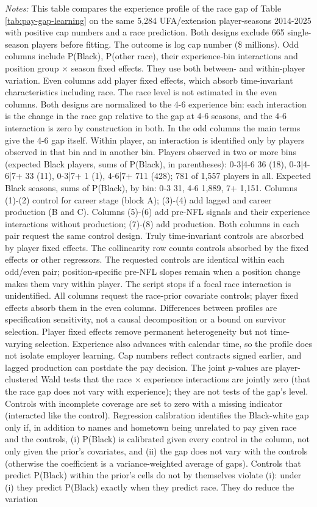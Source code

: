 {\footnotesize
\noindent\textit{Notes:} This table compares the experience profile of the race gap of Table \ref{tab:pay-gap-learning} on the same 5,284 UFA/extension player-seasons 2014-2025 with positive cap numbers and a race prediction. Both designs exclude 665 single-season players before fitting. The outcome is log cap number (\$ millions). Odd columns include P(Black), P(other race), their experience-bin interactions and position group $\times$ season fixed effects. They use both between- and within-player variation. Even columns add player fixed effects, which absorb time-invariant characteristics including race. The race level is not estimated in the even columns. Both designs are normalized to the 4-6 experience bin: each interaction is the change in the race gap relative to the gap at 4-6 seasons, and the 4-6 interaction is zero by construction in both. In the odd columns the main terms give the 4-6 gap itself. Within player, an interaction is identified only by players observed in that bin and in another bin. Players observed in two or more bins (expected Black players, sums of P(Black), in parentheses): 0-3|4-6 36 (18), 0-3|4-6|7+ 33 (11), 0-3|7+ 1 (1), 4-6|7+ 711 (428); 781 of 1,557 players in all. Expected Black seasons, sums of P(Black), by bin: 0-3 31, 4-6 1,889, 7+ 1,151. Columns (1)-(2) control for career stage (block A); (3)-(4) add lagged and career production (B and C). Columns (5)-(6) add pre-NFL signals and their experience interactions without production; (7)-(8) add production. Both columns in each pair request the same control design. Truly time-invariant controls are absorbed by player fixed effects. The collinearity row counts controls absorbed by the fixed effects or other regressors. The requested controls are identical within each odd/even pair; position-specific pre-NFL slopes remain when a position change makes them vary within player. The script stops if a focal race interaction is unidentified. All columns request the race-prior covariate controls; player fixed effects absorb them in the even columns. Differences between profiles are specification sensitivity, not a causal decomposition or a bound on survivor selection. Player fixed effects remove permanent heterogeneity but not time-varying selection. Experience also advances with calendar time, so the profile does not isolate employer learning. Cap numbers reflect contracts signed earlier, and lagged production can postdate the pay decision. The joint $p$-values are player-clustered Wald tests that the race $\times$ experience interactions are jointly zero (that the race gap does not vary with experience); they are not tests of the gap's level. Controls with incomplete coverage are set to zero with a missing indicator (interacted like the control). Regression calibration identifies the Black-white gap only if, in addition to names and hometown being unrelated to pay given race and the controls, (i) P(Black) is calibrated given every control in the column, not only given the prior's covariates, and (ii) the gap does not vary with the controls (otherwise the coefficient is a variance-weighted average of gaps). Controls that predict P(Black) within the prior's cells do not by themselves violate (i): under (i) they predict P(Black) exactly when they predict race. They do reduce the variation }
